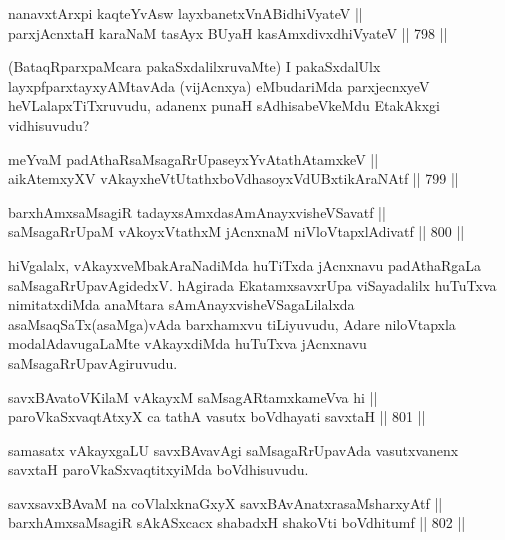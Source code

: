 
\begin{shl}
nanavxtArxpi kaqteYvAsw layxbanetxVnABidhiVyateV || \\
parxjAcnx\s taH karaNaM tasAyx BUyaH kasAmxdivxdhiVyateV \hfill || 798 ||  
\end{shl}

\begin{artha}
(BataqRparxpaMcara pakaSxdalilxruvaMte) I pakaSxdalUlx layxpf\-\break parxtayxyAMtavAda (vijAcnxya) eMbudariMda parxjecnxyeV heVLalapxTiTxruvudu, adanenx punaH sAdhisabeVkeMdu EtakAkxgi vidhisuvudu?
\end{artha}

\begin{shl}
meYvaM padAthaRsaMsagaRrUpaseyxYvAtathAtamxkeV || \\
aikAtemxyXV vAkayxheVtUtathxboVdhasoyxVdUBxtikAraNAtf \hfill || 799 ||  
\end{shl}
				
\begin{shl}
barxhAmxsaMsagiR tadayxsAmxdasAmAnayxvisheVSavatf || \\
saMsagaRrUpaM vAkoyxVtathxM jAcnxnaM niVloVtapxlAdivatf \hfill || 800 ||  
\end{shl}

\begin{artha}
hiVgalalx, vAkayxveMbakAraNadiMda huTiTxda jAcnxnavu padAthaRgaLa saMsagaRrUpavAgidedxV. hAgirada EkatamxsavxrUpa viSayadalilx huTuTxva nimitatxdiMda anaMtara sAmAnayxvisheVSagaLilalxda asaMsaqSaTx(asaMga)\-vAda barxhamxvu tiLiyuvudu, Adare niloVtapxla modalAdavugaLaMte vAkayxdiMda huTuTxva jAcnxnavu saMsagaRrUpavAgiruvudu.
\end{artha}


\begin{shl}
savxBAvatoV\s KilaM vAkayxM saMsagARtamxkameVva hi || \\
paroVkaSxvaqtAtxyX ca tathA vasutx boVdhayati savxtaH \hfill || 801 ||  
\end{shl}

\begin{artha}
samasatx vAkayxgaLU savxBAvavAgi saMsagaRrUpavAda vasutxvanenx savxtaH paroVkaSxvaqtitxyiMda boVdhisuvudu.
\end{artha}

\begin{shl}
savxsavxBAvaM na coVlalxknaGxyX savxBAvAnatxrasaMsharxyAtf || \\
barxhAmxsaMsagiR sAkASxcacx shabadxH shakoVti boVdhitumf \hfill || 802 ||  
\end{shl}

